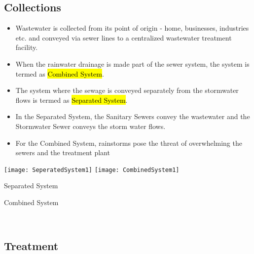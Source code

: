 \subsection{Collections}

\begin{itemize}
\item Wastewater is collected from its point of origin - home, businesses, industries etc. and conveyed via sewer lines to a centralized wastewater treatment facility.  
\item When the rainwater drainage is made part of the sewer system, the system is termed as \hl{Combined System}.  
\item The system where the sewage is conveyed separately from the stormwater flows is termed as \hl{Separated System}.  
\item In the Separated System, the Sanitary Sewers convey the wastewater and the Stormwater Sewer conveys the storm water flows.  
\item For the Combined System, rainstorms pose the threat of overwhelming the sewers and the treatment plant
\end{itemize}
\newpage 
\begin{center}
\texttt{[image: SeperatedSystem1]} \hspace{1 cm} \texttt{[image: CombinedSystem1]}
\end{center}
			\hspace{2.6cm} Separated System \hspace{3.2cm} \parbox{\textwidth}{Combined System}\\

\subsection{Treatment}

